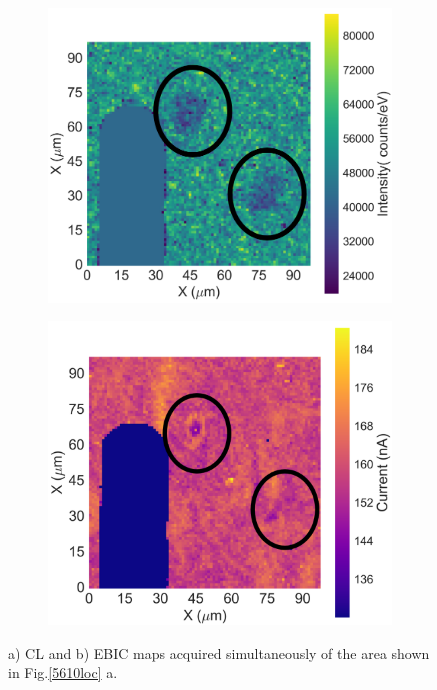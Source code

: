 \FloatBarrier
\begin{figure}[h]
	\hspace*{0.5cm}
	\begin{subfigure}[b]{0.48\textwidth}
		\centering
		\includegraphics[width=1\linewidth]{Figs/Ch3/5610AsmallCL}
		\caption{}
		
	\end{subfigure}%
	\hspace*{0.5cm}
	\begin{subfigure}[b]{0.48\textwidth}
		\centering
		\includegraphics[width=0.98\linewidth]{Figs/Ch3/5610smallEBIC}
		\caption{}
	\end{subfigure}%
	
	\caption{a) CL and b) EBIC maps acquired simultaneously of the area shown in Fig.\ref{5610loc} a.}
	\label{5610CLEBIC}
\end{figure}

